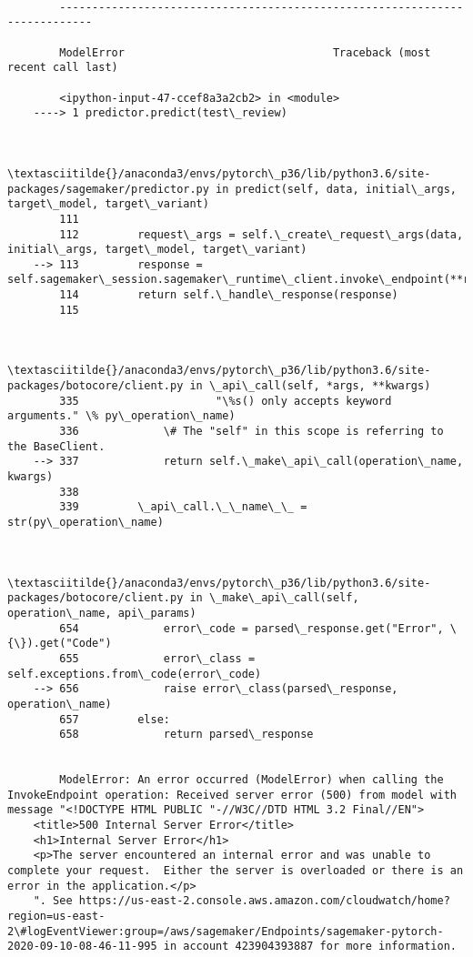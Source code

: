 \documentclass[11pt]{article}
\begin{document}
    \begin{Verbatim}[commandchars=\\\{\}]

        ---------------------------------------------------------------------------

        ModelError                                Traceback (most recent call last)

        <ipython-input-47-ccef8a3a2cb2> in <module>
    ----> 1 predictor.predict(test\_review)
    

        \textasciitilde{}/anaconda3/envs/pytorch\_p36/lib/python3.6/site-packages/sagemaker/predictor.py in predict(self, data, initial\_args, target\_model, target\_variant)
        111 
        112         request\_args = self.\_create\_request\_args(data, initial\_args, target\_model, target\_variant)
    --> 113         response = self.sagemaker\_session.sagemaker\_runtime\_client.invoke\_endpoint(**request\_args)
        114         return self.\_handle\_response(response)
        115 


        \textasciitilde{}/anaconda3/envs/pytorch\_p36/lib/python3.6/site-packages/botocore/client.py in \_api\_call(self, *args, **kwargs)
        335                     "\%s() only accepts keyword arguments." \% py\_operation\_name)
        336             \# The "self" in this scope is referring to the BaseClient.
    --> 337             return self.\_make\_api\_call(operation\_name, kwargs)
        338 
        339         \_api\_call.\_\_name\_\_ = str(py\_operation\_name)


        \textasciitilde{}/anaconda3/envs/pytorch\_p36/lib/python3.6/site-packages/botocore/client.py in \_make\_api\_call(self, operation\_name, api\_params)
        654             error\_code = parsed\_response.get("Error", \{\}).get("Code")
        655             error\_class = self.exceptions.from\_code(error\_code)
    --> 656             raise error\_class(parsed\_response, operation\_name)
        657         else:
        658             return parsed\_response


        ModelError: An error occurred (ModelError) when calling the InvokeEndpoint operation: Received server error (500) from model with message "<!DOCTYPE HTML PUBLIC "-//W3C//DTD HTML 3.2 Final//EN">
    <title>500 Internal Server Error</title>
    <h1>Internal Server Error</h1>
    <p>The server encountered an internal error and was unable to complete your request.  Either the server is overloaded or there is an error in the application.</p>
    ". See https://us-east-2.console.aws.amazon.com/cloudwatch/home?region=us-east-2\#logEventViewer:group=/aws/sagemaker/Endpoints/sagemaker-pytorch-2020-09-10-08-46-11-995 in account 423904393887 for more information.

    \end{Verbatim}
\end{document}
